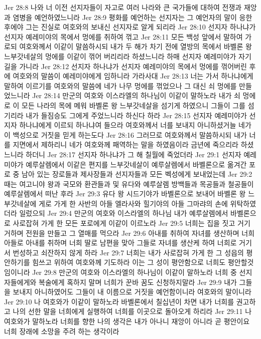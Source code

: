 Jer 28:8  나와 너 이전 선지자들이 자고로 여러 나라와 큰 국가들에 대하여 전쟁과 재앙과 염병을 예언하였느니라
Jer 28:9  평화를 예언하는 선지자는 그 예언자의 말이 응한 후에야 그는 진실로 여호와의 보내신 선지자로 알게 되리라
Jer 28:10  선지자 하나냐가 선지자 예레미야의 목에서 멍에를 취하여 꺾고
Jer 28:11  모든 백성 앞에서 말하여 가로되 여호와께서 이같이 말씀하시되 내가 두 해가 차기 전에 열방의 목에서 바벨론 왕 느부갓네살의 멍에를 이같이 꺾어 버리리라 하셨느니라 하매 선지자 예레미야가 자기 길을 가니라
Jer 28:12  선지자 하나냐가 선지자 예레미야의 목에서 멍에를 꺾어버린 후에 여호와의 말씀이 예레미야에게 임하니라 가라사대
Jer 28:13  너는 가서 하나냐에게 말하여 이르기를 여호와의 말씀에 네가 나무 멍에를 꺾었으나 그 대신 쇠 멍에를 만들었느니라
Jer 28:14  만군의 여호와 이스라엘의 하나님이 이같이 말하노라 내가 쇠 멍에로 이 모든 나라의 목에 메워 바벨론 왕 느부갓네살을 섬기게 하였으니 그들이 그를 섬기리라 내가 들짐승도 그에게 주었느니라 하신다 하라
Jer 28:15  선지자 예레미야가 선지자 하나냐에게 이르되 하나냐여 들으라 여호와께서 너를 보내지 아니하셨거늘 네가 이 백성으로 거짓을 믿게 하는도다
Jer 28:16  그러므로 여호와께서 말씀하시되 내가 너를 지면에서 제하리니 네가 여호와께 패역하는 말을 하였음이라 금년에 죽으리라 하셨느니라 하더니
Jer 28:17  선지자 하나냐가 그 해 칠월에 죽었더라
Jer 29:1  선지자 예레미야가 예루살렘에서 이같은 편지를 느부갓네살이 예루살렘에서 바벨론으로 옮겨간 포로 중 남아 있는 장로들과 제사장들과 선지자들과 모든 벡성에게 보내었는데
Jer 29:2  때는 여고니야 왕과 국모와 환관들과 및 유다와 예루살렘 방백들과 목공들과 철공들이 예루살렘에서 떠난 후라
Jer 29:3  유다 왕 시드기야가 바벨론으로 보내어 바벨론 왕 느부갓네살에 게로 가게 한 사반의 아들 엘라사와 힐기야의 아들 그마랴의 손에 위탁하였더라 일렀으되
Jer 29:4  만군의 여호와 이스라엘의 하나님 내가 예루살렘에서 바벨론으로 사로잡혀 가게 한 모든 포로에게 이같이 이르노라
Jer 29:5  너희는 집을 짓고 거기 거하며 전원을 만들고 그 열매를 먹으라
Jer 29:6  아내를 취하여 자녀를 생산하며 너희 아들로 아내를 취하며 너희 딸로 남편을 맞아 그들로 자녀를 생산케 하여 너희로 거기서 번성하고 쇠잔하지 않게 하라
Jer 29:7  너희는 내가 사로잡혀 가게 한 그 성읍의 평안하기를 힘쓰고 위하여 여호와께 기도하라 이는 그 성이 평안함으로 너희도 평안할것임이니라
Jer 29:8  만군의 여호와 이스라엘의 하나님이 이같이 말하노라 너희 중 선지자들에게와 복술에게 혹하지 말며 너희가 꾼바 꿈도 신청하지말라
Jer 29:9  내가 그들을 보내지 아니하였어도 그들이 내 이름으로 거짓을 예언함이니라 여호와의 말이니라
Jer 29:10  나 여호와가 이같이 말하노라 바벨론에서 칠십년이 차면 내가 너희를 권고하고 나의 선한 말을 너희에게 실행하여 너희를 이곳으로 돌아오게 하리라
Jer 29:11  나 여호와가 말하노라 너희를 향한 나의 생각은 내가 아나니 재앙이 아니라 곧 평안이요 너희 장래에 소망을 주려 하는 생각이라
